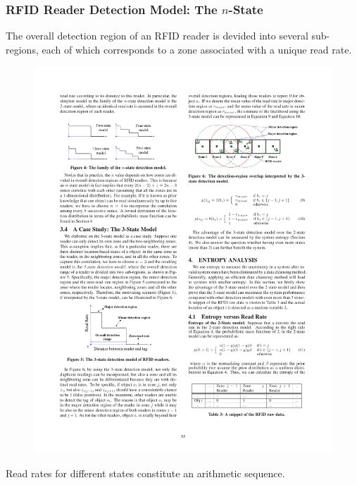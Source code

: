
\begin{frame}
\frametitle{RFID Reader Detection Model: The $n$-State}

The overall detection region of an RFID reader is devided into several sub-regions, each of which corresponds to a zone associated with a unique read rate.

\begin{figure}[tb]
  \includegraphics[width=0.8\columnwidth]{figures/3-1/3-1-5.pdf}
\end{figure}

Read rates for different states constitute an arithmetic sequence.

\end{frame}


